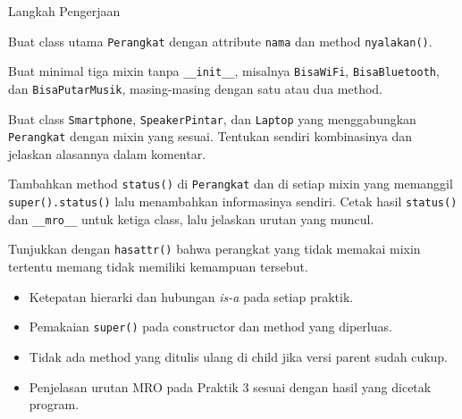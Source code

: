 \begin{langkah}{Langkah Pengerjaan}
  \item Buat class utama \texttt{Perangkat} dengan attribute \texttt{nama} dan method \texttt{nyalakan()}.
  \item Buat minimal tiga mixin tanpa \texttt{\_\_init\_\_}, misalnya \texttt{BisaWiFi}, \texttt{BisaBluetooth}, dan \texttt{BisaPutarMusik}, masing-masing dengan satu atau dua method.
  \item Buat class \texttt{Smartphone}, \texttt{SpeakerPintar}, dan \texttt{Laptop} yang menggabungkan \texttt{Perangkat} dengan mixin yang sesuai. Tentukan sendiri kombinasinya dan jelaskan alasannya dalam komentar.
  \item Tambahkan method \texttt{status()} di \texttt{Perangkat} dan di setiap mixin yang memanggil \texttt{super().status()} lalu menambahkan informasinya sendiri. Cetak hasil \texttt{status()} dan \texttt{\_\_mro\_\_} untuk ketiga class, lalu jelaskan urutan yang muncul.
  \item Tunjukkan dengan \texttt{hasattr()} bahwa perangkat yang tidak memakai mixin tertentu memang tidak memiliki kemampuan tersebut.
\end{langkah}

\begin{penting}
\begin{itemize}
  \item Ketepatan hierarki dan hubungan \emph{is-a} pada setiap praktik.
  \item Pemakaian \texttt{super()} pada constructor dan method yang diperluas.
  \item Tidak ada method yang ditulis ulang di child jika versi parent sudah cukup.
  \item Penjelasan urutan MRO pada Praktik 3 sesuai dengan hasil yang dicetak program.
\end{itemize}
\end{penting}